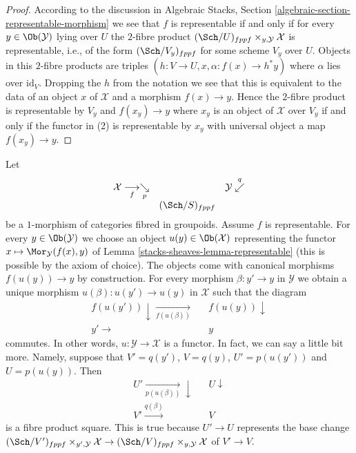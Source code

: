 \begin{proof}
According to the discussion in
Algebraic Stacks, Section \ref{algebraic-section-representable-morphism}
we see that $f$ is representable if and only if
for every $y \in \Ob(\mathcal{Y})$
lying over $U$ the $2$-fibre product
$(\Sch/U)_{fppf} \times_{y, \mathcal{Y}} \mathcal{X}$
is representable, i.e., of the form $(\Sch/V_y)_{fppf}$ for some
scheme $V_y$ over $U$. Objects in this $2$-fibre products are triples
$(h : V \to U, x, \alpha : f(x) \to h^*y)$ where $\alpha$ lies
over $\text{id}_V$. Dropping the $h$ from the notation we see that this
is equivalent to the data of an object $x$ of $\mathcal{X}$ and a
morphism $f(x) \to y$. Hence the $2$-fibre product is
representable by $V_y$ and $f(x_y) \to y$ where $x_y$ is an object
of $\mathcal{X}$ over $V_y$ if and only if the functor in (2) is representable
by $x_y$ with universal object a map $f(x_y) \to y$.
\end{proof}

Let
$$
\begin{array}{ccc}\mathcal{X} \underset{f}{\longrightarrow}\underset{p}{\searrow} &  & \mathcal{Y} \overset{q}{\swarrow} \\  & (\Sch/S)_{fppf} & \end{array}
$$
be a $1$-morphism of categories fibred in groupoids. Assume $f$ is
representable. For every $y \in \Ob(\mathcal{Y})$ we choose
an object $u(y) \in \Ob(\mathcal{X})$ representing the functor
$x \mapsto \Mor_\mathcal{Y}(f(x), y)$ of
Lemma \ref{stacks-sheaves-lemma-representable}
(this is possible by the axiom of choice).
The objects come with canonical morphisms $f(u(y)) \to y$ by
construction.
For every morphism $\beta : y' \to y$ in $\mathcal{Y}$ we obtain a unique
morphism $u(\beta) : u(y') \to u(y)$ in $\mathcal{X}$ such that the diagram
$$
\begin{array}{ccc}f(u(y')) \downarrow\underset{f(u(\beta))}{\longrightarrow} &  & f(u(y)) \downarrow \\ y' \longrightarrow &  & y\end{array}
$$
commutes. In other words, $u : \mathcal{Y} \to \mathcal{X}$ is a functor.
In fact, we can say a little bit more. Namely, suppose that
$V' = q(y')$, $V = q(y)$, $U' = p(u(y'))$ and $U = p(u(y))$. Then
$$
\begin{array}{ccc}U' \underset{p(u(\beta))}{\longrightarrow}\downarrow &  & U \downarrow \\ V' \overset{q(\beta)}{\longrightarrow} &  & V\end{array}
$$
is a fibre product square. This is true because $U' \to U$ represents
the base change
$(\Sch/V')_{fppf} \times_{y', \mathcal{Y}} \mathcal{X} \to
(\Sch/V)_{fppf} \times_{y, \mathcal{Y}} \mathcal{X}$
of $V' \to V$.

